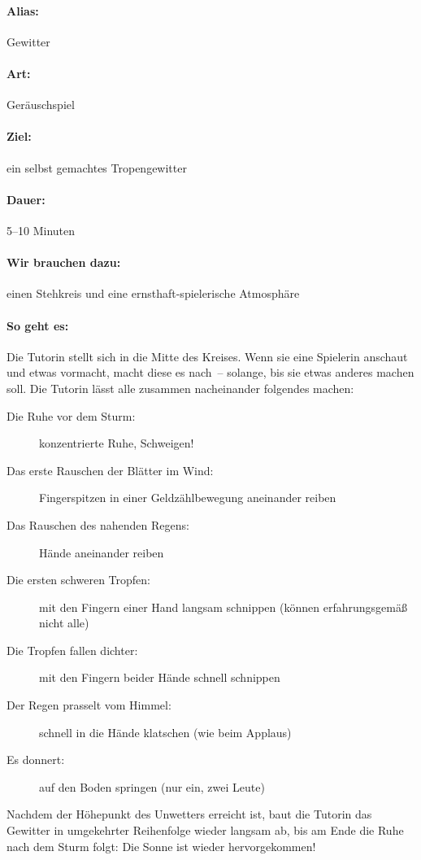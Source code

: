 \paragraph{Alias:} Gewitter
\paragraph{Art:} Geräuschspiel
\paragraph{Ziel:} ein selbst gemachtes Tropengewitter
\paragraph{Dauer:} 5--10 Minuten
\paragraph{Wir brauchen dazu:} einen Stehkreis und eine ernsthaft-spielerische Atmosphäre
\paragraph{So geht es:} Die Tutorin stellt sich in die Mitte des Kreises. Wenn sie eine Spielerin anschaut und etwas vormacht, macht diese es nach~-- solange, bis sie etwas anderes machen soll. Die Tutorin lässt alle zusammen nacheinander folgendes machen:
  \begin{description}
    \item[Die Ruhe vor dem Sturm:] konzentrierte Ruhe, Schweigen!
    \item[Das erste Rauschen der Blätter im Wind:] Fingerspitzen in einer Geldzählbewegung aneinander reiben
    \item[Das Rauschen des nahenden Regens:] Hände aneinander reiben
    \item[Die ersten schweren Tropfen:] mit den Fingern einer Hand langsam schnippen (können erfahrungsgemäß nicht alle)
    \item[Die Tropfen fallen dichter:] mit den Fingern beider Hände schnell schnippen
    \item[Der Regen prasselt vom Himmel:] schnell in die Hände klatschen (wie beim Applaus)
    \item[Es donnert:] auf den Boden springen (nur ein, zwei Leute)
  \end{description}
Nachdem der Höhepunkt des Unwetters erreicht ist, baut die Tutorin das Gewitter in umgekehrter Reihenfolge wieder langsam ab, bis am Ende die Ruhe nach dem Sturm folgt: Die Sonne ist wieder hervorgekommen!
